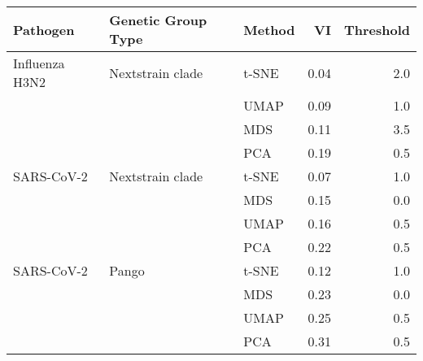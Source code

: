 \begin{tabular}{lllrr}
\toprule
      Pathogen & Genetic Group Type & Method &   VI &  Threshold \\
\midrule
Influenza H3N2 &   Nextstrain clade &  t-SNE & 0.04 &        2.0 \\
               &                    &   UMAP & 0.09 &        1.0 \\
               &                    &    MDS & 0.11 &        3.5 \\
               &                    &    PCA & 0.19 &        0.5 \\
    SARS-CoV-2 &   Nextstrain clade &  t-SNE & 0.07 &        1.0 \\
               &                    &    MDS & 0.15 &        0.0 \\
               &                    &   UMAP & 0.16 &        0.5 \\
               &                    &    PCA & 0.22 &        0.5 \\
    SARS-CoV-2 &              Pango &  t-SNE & 0.12 &        1.0 \\
               &                    &    MDS & 0.23 &        0.0 \\
               &                    &   UMAP & 0.25 &        0.5 \\
               &                    &    PCA & 0.31 &        0.5 \\
\bottomrule
\end{tabular}
